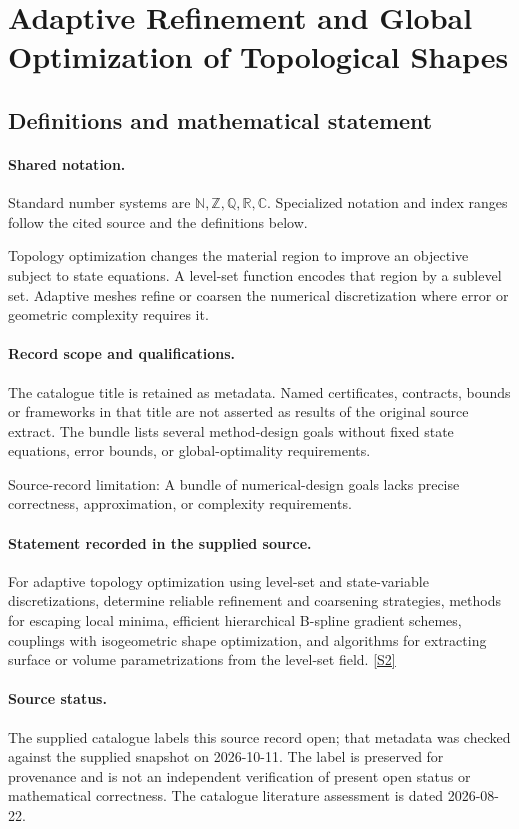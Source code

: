 \documentclass[11pt]{article}
\newcommand{\sref}[2]{\hyperlink{source:#1:#2}{[S#2]}}
\begin{document}
\section{Adaptive Refinement and Global Optimization of Topological Shapes}\label{statement}

\subsection{Definitions and mathematical statement}

\paragraph{Shared notation.}Standard number systems are $\mathbb N,\mathbb Z,\mathbb Q,\mathbb R,\mathbb C$. Specialized notation and index ranges follow the cited source and the definitions below.


Topology optimization changes the material region to improve an objective subject to state equations. A level-set function encodes that region by a sublevel set. Adaptive meshes refine or coarsen the numerical discretization where error or geometric complexity requires it.
\paragraph{Record scope and qualifications.}
The catalogue title is retained as metadata. Named certificates, contracts, bounds or frameworks in that title are not asserted as results of the original source extract.
The bundle lists several method-design goals without fixed state equations, error bounds, or global-optimality requirements.

Source-record limitation: A bundle of numerical-design goals lacks precise correctness, approximation, or complexity requirements.
\paragraph{Statement recorded in the supplied source.}
For adaptive topology optimization using level-set and state-variable discretizations, determine reliable refinement and coarsening strategies, methods for escaping local minima, efficient hierarchical B-spline gradient schemes, couplings with isogeometric shape optimization, and algorithms for extracting surface or volume parametrizations from the level-set field. \sref{statement}{2}
\paragraph{Source status.}
The supplied catalogue labels this source record open; that metadata was checked against the supplied snapshot on 2026-10-11. The label is preserved for provenance and is not an independent verification of present open status or mathematical correctness. The catalogue literature assessment is dated 2026-08-22.
\end{document}
